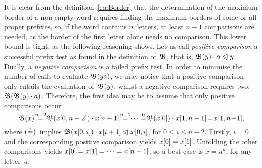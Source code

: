 It is clear from the definition~\eqref{eq:Border} 
that the determination of the maximum border of a non\hyp{}empty word
requires finding the maximum borders of some or all proper prefixes,
so, if the word contains \(n\)~letters, at least \(n-1\) comparisons
are needed, as the border of the first letter alone needs no
comparison. This lower bound is tight, as the following reasoning
shows. Let us call \emph{positive comparison} a successful prefix test as
found in the definition of~\(\mathfrak{B}\), that is, \(\mathfrak{B}^{}(y)
\cdot a \mathrel{\trianglelefteqslant} y\). Dually, a \emph{negative comparison} is a failed prefix test. In
order to minimise the number of calls to evaluate \(\mathfrak{B}^{}(ya)\),
we may notice that a positive comparison only entails the evaluation
of~\(\mathfrak{B}^{}(y)\), whilst a negative comparison requires two:
\(\mathfrak{B}^{}(\mathfrak{B}^{}(y) \cdot a)\). Therefore, the first idea may be
to assume that only positive comparisons occur:
\begin{equation*}
\Border{}{x} \!\eqn{n-2}\! 
\Border{}{\ind{x}{0,n-2}} \cdot \ind{x}{n-1}
\!\eqn{n-1}\!\! \dots
\eqn{0}\! \Border{}{\ind{x}{0}} \cdot \ind{x}{1,n-1}
\!=\! \ind{x}{1,n\!-\!1},
\end{equation*}
where \((\smash{\mathrel{\stackrel{\smash{i}}{=}}})\)~implies \(\mathfrak{B}^{}({x}[{0,i}]) \cdot
{x}[{i+1}] \mathrel{\trianglelefteqslant} {x}[{0,i}]\), for \(0 \leqslant i \leqslant
n-2\). Firstly, \(i=0\) and the corresponding positive comparison
yields \({x}[{0}] = {x}[{1}]\). Unfolding the other comparisons
yields \({x}[{0}] = {x}[{1}] = \dots = {x}[{n-1}]\), so a best
case is \(x=a^n\), for any letter~\(a\).


